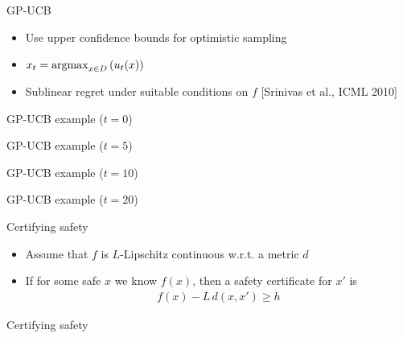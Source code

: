 \documentclass[xetex,10pt,mathserif,handout]{beamer}
\newlength\figureheight
\newlength\figurewidth
\begin{document}
\begin{frame}{GP-UCB}
\begin{itemize}
\item Use upper confidence bounds for optimistic sampling
\vspace{2em}
\item $x_t = \argmax_{x \in D} \left( u_t(x) \right)$
\vspace{2em}
\item Sublinear regret under suitable conditions on $f$ [Srinivas et al., ICML 2010]
\end{itemize}
\end{frame}

\begin{frame}{GP-UCB example ($t = 0$)}
\centering
\setlength\figurewidth{5in}
\setlength\figureheight{3.5in}

\end{frame}

\begin{frame}{GP-UCB example ($t = 5$)}
\centering
\setlength\figurewidth{5in}
\setlength\figureheight{3.5in}

\end{frame}

\begin{frame}{GP-UCB example ($t = 10$)}
\centering
\setlength\figurewidth{5in}
\setlength\figureheight{3.5in}

\end{frame}

\begin{frame}{GP-UCB example ($t = 20$)}
\centering
\setlength\figurewidth{5in}
\setlength\figureheight{3.5in}

\end{frame}

\begin{frame}{Certifying safety}
\begin{itemize}
\item Assume that $f$ is $L$-Lipschitz continuous w.r.t. a metric $d$
\vspace{2em}
\item If for some safe $x$ we know $f(x)$, then a safety certificate for $x'$ is
\begin{align*}
f(x) - L\,d(x, x') \geq h
\end{align*}
\end{itemize}
\end{frame}

\begin{frame}{Certifying safety}
\centering
\setlength\figurewidth{5in}
\setlength\figureheight{3.5in}

\end{frame}
\end{document}
